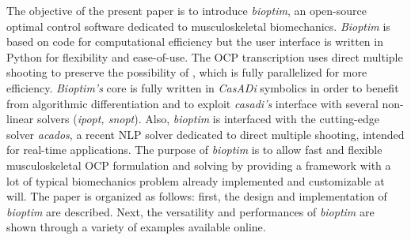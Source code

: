 

The objective of the present paper is to introduce \textit{bioptim}, an open-source optimal control software dedicated to musculoskeletal biomechanics.
\textit{Bioptim} is based on  code for computational efficiency but the user interface is written in Python for flexibility and ease-of-use. 
The OCP transcription uses direct multiple shooting to preserve the possibility of , which is fully parallelized for more efficiency.
\textit{Bioptim's} core is fully written in \textit{CasADi} symbolics in order to benefit from algorithmic differentiation and to exploit \textit{casadi's} interface with several non-linear solvers (\textit{ipopt, snopt}).
Also, \textit{bioptim} is interfaced with the cutting-edge solver \textit{acados}, a recent NLP solver dedicated to direct multiple shooting, intended for real-time applications.
The purpose of \textit{bioptim} is to allow fast and flexible musculoskeletal OCP formulation and solving by providing a framework with a lot of typical biomechanics problem already implemented and customizable at will.
The paper is organized as follows: first, the design and implementation of \textit{bioptim} are described.
Next, the versatility and performances of \textit{bioptim} are shown through a variety of examples available online. 
